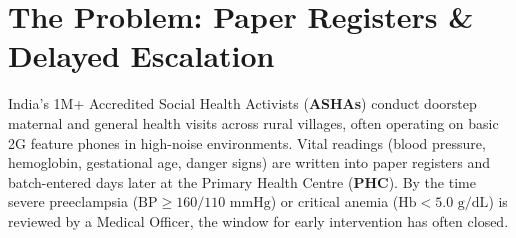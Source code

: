\documentclass[9pt,a4paper,twocolumn]{article}
\begin{document}

\section{The Problem: Paper Registers \& Delayed Escalation}
India's 1M+ Accredited Social Health Activists (\textbf{ASHAs}) conduct doorstep maternal and general health visits across rural villages, often operating on basic 2G feature phones in high-noise environments. Vital readings (blood pressure, hemoglobin, gestational age, danger signs) are written into paper registers and batch-entered days later at the Primary Health Centre (\textbf{PHC}). By the time severe preeclampsia ($\text{BP} \ge 160/110\text{ mmHg}$) or critical anemia ($\text{Hb} < 5.0\text{ g/dL}$) is reviewed by a Medical Officer, the window for early intervention has often closed.
\end{document}
